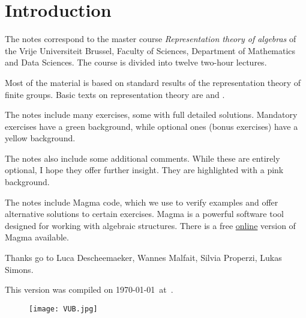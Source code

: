 \thispagestyle{plain}
\section*{Introduction}

The notes correspond to the master  
course \emph{Representation theory of algebras} of the 
Vrije Universiteit Brussel, 
Faculty of Sciences, 
Department of Mathematics and Data Sciences. The course
is divided into twelve two-hour lectures. 

Most of the material is based on standard 
results of the representation theory of finite groups. 
Basic texts on representation theory are \cite{MR1369573} 
and \cite{MR2270898}. 

The notes include many exercises, some with full detailed solutions. Mandatory exercises have a \colorbox{green!5!white}{green background}, while optional ones
(bonus exercises) have a \colorbox{yellow!15!white}{yellow background}.

The notes also include some additional comments. While these are entirely optional, I hope they offer further insight. They are highlighted with a \colorbox{red!5!white}{pink background}.

The notes include Magma code, which we use to verify examples and offer alternative solutions to certain exercises. Magma \cite{zbMATH01077111} is a powerful software tool designed for working with algebraic structures. There is a free \href{https://magma.maths.usyd.edu.au/calc/}{online} version of Magma available.


Thanks go to Luca Descheemaeker, Wannes Malfait, Silvia Properzi, Lukas Simons.  



This version 
was compiled on \today~at~\currenttime.


 \begin{figure}[b]
     \texttt{[image: VUB.jpg]}
 \end{figure}